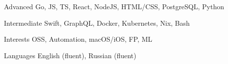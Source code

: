 
\begin{cvskills}

  \cvskill
    {Advanced}
    {Go, JS, TS, React, NodeJS, HTML/CSS, PostgreSQL, Python}

    \cvskill
    {Intermediate}
    {Swift, GraphQL, Docker, Kubernetes, Nix, Bash}

   \cvskill
    {Interests}
    {OSS, Automation, macOS/iOS, FP, ML}

  \cvskill
    {Languages}
    {English (fluent), Russian (fluent)}

\end{cvskills}
